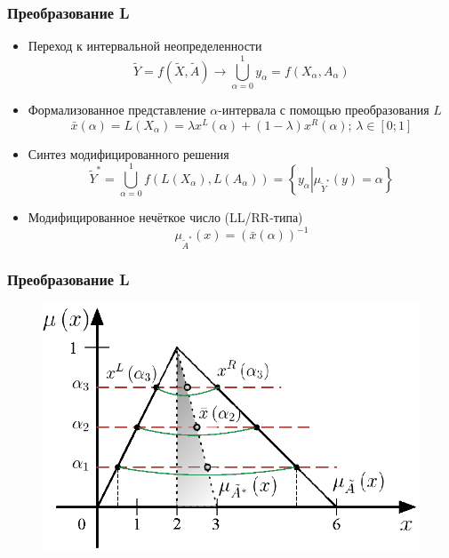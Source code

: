 \documentclass[12pt]{beamer}
\begin{document}
\begin{frame}
  \frametitle{Преобразование L}
  \begin{itemize}
    \item Переход к интервальной неопределенности
      \begin{equation}
        \label{eq:task-transform}
      	\tilde{Y} = f\left( \tilde X, \tilde A \right)\to \bigcup\limits_{\alpha =0}^{1}{y_\alpha}=f\left( X_\alpha, A_\alpha \right)
      \end{equation}
    \item Формализованное представление $\alpha$-интервала с помощью преобразования $L$
      \begin{equation}
        \label{eq:L-transform-base}
        \bar{x}\left( \alpha  \right)=L\left( X_\alpha \right)=\lambda x^L \left( \alpha  \right)+\left( 1-\lambda  \right) x^R \left( \alpha  \right);\, \lambda \in \left[0; 1 \right]
      \end{equation}
    \item Синтез модифицированного решения
      \begin{equation}
        \tilde Y^{*}= \bigcup\limits_{\alpha =0}^{1} f\left(L\left( X_\alpha \right), L\left( A_\alpha \right) \right)=\left\{ y_\alpha \left| \mu_{\tilde Y^*}(y)=\alpha \right. \right\}
      \end{equation}
    \item Модифицированное нечёткое число (LL/RR-типа)
      \begin{equation}
        \label{eq:modified-number}
        \mu_{\tilde A^{*}}\left( x \right)={\left( \bar{x}\left( \alpha  \right) \right)}^{-1}
      \end{equation}
  \end{itemize}
\end{frame}


\begin{frame}
  \frametitle{Преобразование L}
  \begin{figure}
    \center
    \includegraphics[width=\textwidth]{l-transform-full}
  \end{figure}
\end{frame}
\end{document}
